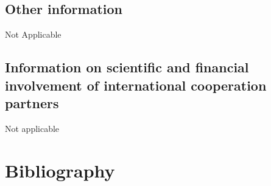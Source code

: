 \documentclass[10pt,fleqn,twoside]{article}
\newcommand{\Tcol}{\color{blue}}
\begin{document}
\subsection{\Tcol Other information}

Not Applicable 

\subsection{\Tcol Information on scientific and financial involvement of international cooperation partners}

Not applicable 

\section{\Tcol Bibliography}
\end{document}
